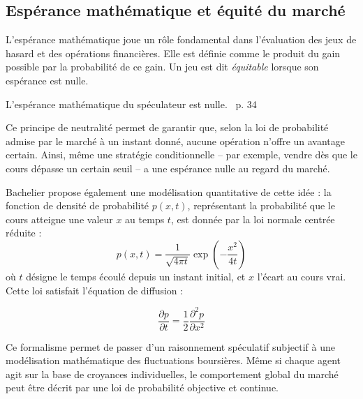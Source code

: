 \documentclass[12pt,a4paper]{article}
\begin{document}
\subsection{Espérance mathématique et équité du marché}

L’espérance mathématique joue un rôle fondamental dans l’évaluation des jeux de hasard et des opérations financières. Elle est définie comme le produit du gain possible par la probabilité de ce gain. Un jeu est dit \textit{équitable} lorsque son espérance est nulle.

\begin{center}
    \og L’espérance mathématique du spéculateur est nulle. \fg\ p. 34
\end{center}

Ce principe de neutralité permet de garantir que, selon la loi de probabilité admise par le marché à un instant donné, aucune opération n’offre un avantage certain. Ainsi, même une stratégie conditionnelle -- par exemple, vendre dès que le cours dépasse un certain seuil -- a une espérance nulle au regard du marché.

Bachelier propose également une modélisation quantitative de cette idée : la fonction de densité de probabilité $p(x,t)$, représentant la probabilité que le cours atteigne une valeur $x$ au temps $t$, est donnée par la loi normale centrée réduite :
\[
p(x,t) = \frac{1}{\sqrt{4\pi t}} \exp\left(-\frac{x^2}{4t}\right)
\]
où $t$ désigne le temps écoulé depuis un instant initial, et $x$ l’écart au cours vrai. Cette loi satisfait l’équation de diffusion :

\[
\frac{\partial p}{\partial t} = \frac{1}{2} \frac{\partial^2 p}{\partial x^2}
\]

Ce formalisme permet de passer d’un raisonnement spéculatif subjectif à une modélisation mathématique des fluctuations boursières. Même si chaque agent agit sur la base de croyances individuelles, le comportement global du marché peut être décrit par une loi de probabilité objective et continue.
\end{document}
